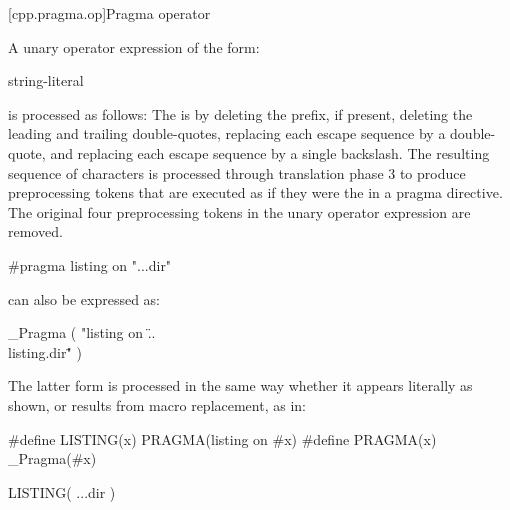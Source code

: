 [cpp.pragma.op]{Pragma operator}%
%

\pnum
A unary operator expression of the form:
\begin{ncbnf}
 \terminal{(} string-literal \terminal{)}
\end{ncbnf}
is processed as follows: The  is 
by deleting the  prefix, if present, deleting the leading and trailing
double-quotes, replacing each escape sequence  by a double-quote, and
replacing each escape sequence \tcode{\textbackslash\textbackslash} by a single
backslash. The resulting sequence of characters is processed through translation phase 3
to produce preprocessing tokens that are executed as if they were the
 in a pragma directive. The original four preprocessing
tokens in the unary operator expression are removed.

\pnum
\begin{example}
\begin{codeblock}
#pragma listing on "..\listing.dir"
\end{codeblock}
can also be expressed as:
\begin{codeblock}
_Pragma ( "listing on \"..\\listing.dir\"" )
\end{codeblock}
The latter form is processed in the same way whether it appears literally
as shown, or results from macro replacement, as in:
\begin{codeblock}
#define LISTING(x) PRAGMA(listing on #x)
#define PRAGMA(x) _Pragma(#x)

LISTING( ..\listing.dir )
\end{codeblock}
\end{example}
